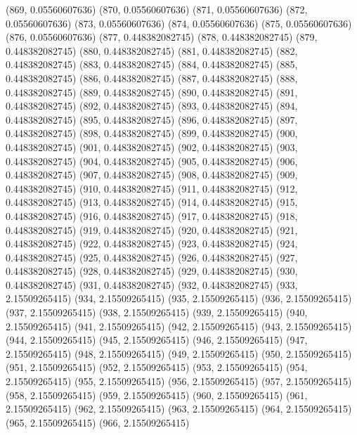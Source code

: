 {					(869, 0.05560607636)
					(870, 0.05560607636)
					(871, 0.05560607636)
					(872, 0.05560607636)
					(873, 0.05560607636)
					(874, 0.05560607636)
					(875, 0.05560607636)
					(876, 0.05560607636)
					(877, 0.448382082745)
					(878, 0.448382082745)
					(879, 0.448382082745)
					(880, 0.448382082745)
					(881, 0.448382082745)
					(882, 0.448382082745)
					(883, 0.448382082745)
					(884, 0.448382082745)
					(885, 0.448382082745)
					(886, 0.448382082745)
					(887, 0.448382082745)
					(888, 0.448382082745)
					(889, 0.448382082745)
					(890, 0.448382082745)
					(891, 0.448382082745)
					(892, 0.448382082745)
					(893, 0.448382082745)
					(894, 0.448382082745)
					(895, 0.448382082745)
					(896, 0.448382082745)
					(897, 0.448382082745)
					(898, 0.448382082745)
					(899, 0.448382082745)
					(900, 0.448382082745)
					(901, 0.448382082745)
					(902, 0.448382082745)
					(903, 0.448382082745)
					(904, 0.448382082745)
					(905, 0.448382082745)
					(906, 0.448382082745)
					(907, 0.448382082745)
					(908, 0.448382082745)
					(909, 0.448382082745)
					(910, 0.448382082745)
					(911, 0.448382082745)
					(912, 0.448382082745)
					(913, 0.448382082745)
					(914, 0.448382082745)
					(915, 0.448382082745)
					(916, 0.448382082745)
					(917, 0.448382082745)
					(918, 0.448382082745)
					(919, 0.448382082745)
					(920, 0.448382082745)
					(921, 0.448382082745)
					(922, 0.448382082745)
					(923, 0.448382082745)
					(924, 0.448382082745)
					(925, 0.448382082745)
					(926, 0.448382082745)
					(927, 0.448382082745)
					(928, 0.448382082745)
					(929, 0.448382082745)
					(930, 0.448382082745)
					(931, 0.448382082745)
					(932, 0.448382082745)
					(933, 2.15509265415)
					(934, 2.15509265415)
					(935, 2.15509265415)
					(936, 2.15509265415)
					(937, 2.15509265415)
					(938, 2.15509265415)
					(939, 2.15509265415)
					(940, 2.15509265415)
					(941, 2.15509265415)
					(942, 2.15509265415)
					(943, 2.15509265415)
					(944, 2.15509265415)
					(945, 2.15509265415)
					(946, 2.15509265415)
					(947, 2.15509265415)
					(948, 2.15509265415)
					(949, 2.15509265415)
					(950, 2.15509265415)
					(951, 2.15509265415)
					(952, 2.15509265415)
					(953, 2.15509265415)
					(954, 2.15509265415)
					(955, 2.15509265415)
					(956, 2.15509265415)
					(957, 2.15509265415)
					(958, 2.15509265415)
					(959, 2.15509265415)
					(960, 2.15509265415)
					(961, 2.15509265415)
					(962, 2.15509265415)
					(963, 2.15509265415)
					(964, 2.15509265415)
					(965, 2.15509265415)
					(966, 2.15509265415)
}
